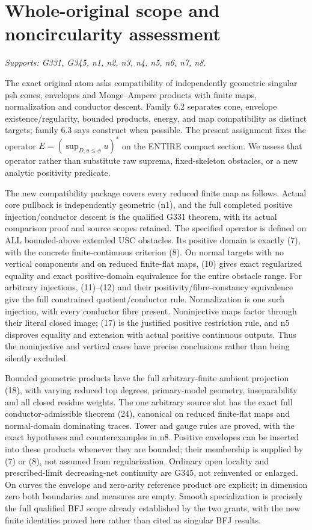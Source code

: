\section{Whole-original scope and noncircularity assessment}
\textit{Supports: G331, G345, n1, n2, n3, n4, n5, n6, n7, n8.}

The exact original atom asks compatibility of independently geometric singular psh cones, envelopes and Monge--Ampere products with finite maps, normalization and conductor descent. Family 6.2 separates cone, envelope existence/regularity, bounded products, energy, and map compatibility as distinct targets; family 6.3 says construct when possible. The present assignment fixes the operator $E=(\sup_{D,u\le\phi}u)^*$ on the ENTIRE compact section. We assess that operator rather than substitute raw suprema, fixed-skeleton obstacles, or a new analytic positivity predicate.

The new compatibility package covers every reduced finite map as follows. Actual core pullback is independently geometric (n1), and the full completed positive injection/conductor descent is the qualified G331 theorem, with its actual comparison proof and source scopes retained. The specified operator is defined on ALL bounded-above extended USC obstacles. Its positive domain is exactly (7), with the concrete finite-continuous criterion (8). On normal targets with no vertical components and on reduced finite-flat maps, (10) gives exact regularized equality and exact positive-domain equivalence for the entire obstacle range. For arbitrary injections, (11)--(12) and their positivity/fibre-constancy equivalence give the full constrained quotient/conductor rule. Normalization is one such injection, with every conductor fibre present. Noninjective maps factor through their literal closed image; (17) is the justified positive restriction rule, and n5 disproves equality and extension with actual positive continuous outputs. Thus the noninjective and vertical cases have precise conclusions rather than being silently excluded.

Bounded geometric products have the full arbitrary-finite ambient projection (18), with varying reduced top degrees, primary-model geometry, inseparability and all closed residue weights. The one arbitrary source slot has the exact full conductor-admissible theorem (24), canonical on reduced finite-flat maps and normal-domain dominating traces. Tower and gauge rules are proved, with the exact hypotheses and counterexamples in n8. Positive envelopes can be inserted into these products whenever they are bounded; their membership is supplied by (7) or (8), not assumed from regularization. Ordinary open locality and prescribed-limit decreasing-net continuity are G345, not reinvented or enlarged. On curves the envelope and zero-arity reference product are explicit; in dimension zero both boundaries and measures are empty. Smooth specialization is precisely the full qualified BFJ scope already established by the two grants, with the new finite identities proved here rather than cited as singular BFJ results.

